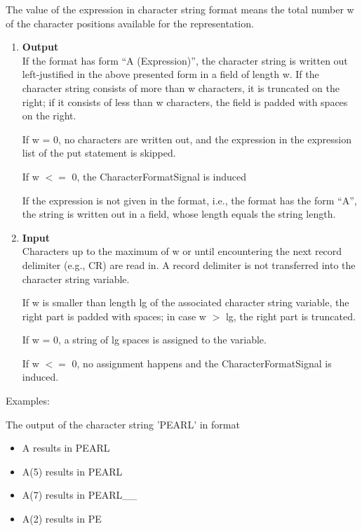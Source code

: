 The value of the expression in character string format means the total
number w of the character positions available for the representation.
\begin{enumerate}
\item {\bf Output}\\
If the format has form ``A (Expression)'', the character string is
written out left-justified in the above presented form in a field of
length w. If the character string consists of more than w characters, it
is truncated on the right; if it consists of less than w characters, the
field is padded with spaces on the right. 
\begin{removed}
If w = 0, no characters are
written out, and the expression in the expression list of the put
statement is skipped.
\end{removed}
\begin{added}
If w $<=$ 0, the CharacterFormatSignal is induced
\end{added}

If the expression is not given in the format, i.e., the format has the
form ``A'', the string is written out in a field, whose length equals
the string length.
\item {\bf Input}\\
Characters up to the maximum of w or until encountering the next record
delimiter (e.g., CR) are read in. A record delimiter is not transferred
into the character string variable.

If w is smaller than length lg of the associated character string
variable, the right part is padded with spaces; in case w $>$ lg, the
right part is truncated.
\begin{removed}
 If w = 0, a string of lg spaces is assigned to
the variable.
\end{removed}
\begin{added}
 If w $<=$ 0, no assignment happens and the CharacterFormatSignal is 
   induced. 
\end{added}
\end{enumerate}

Examples:

The output of the character string 'PEARL' in format

\begin{itemize}
\item A    results in PEARL 
\item A(5) results in PEARL 
\item A(7) results in PEARL\_\_ 
\item A(2) results in PE
\end{itemize}

